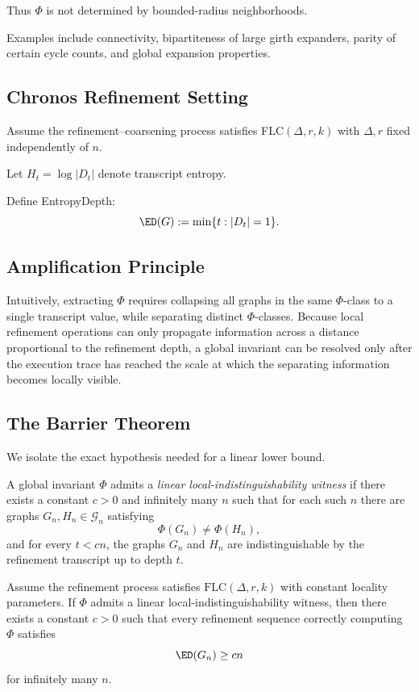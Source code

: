 Thus $\Phi$ is not determined by bounded-radius neighborhoods.

Examples include connectivity, bipartiteness of large girth expanders,
parity of certain cycle counts, and global expansion properties.

\subsection{Chronos Refinement Setting}

Assume the refinement–coarsening process satisfies
FLC$(\Delta,r,k)$ with $\Delta,r$ fixed independently of $n$.

Let $H_t = \log |D_t|$ denote transcript entropy.

Define EntropyDepth:
\[
\ED(G) := \min \{ t : |D_t| = 1 \}.
\]

\subsection{Amplification Principle}

Intuitively, extracting $\Phi$ requires collapsing
all graphs in the same $\Phi$-class to a single transcript value,
while separating distinct $\Phi$-classes. Because local refinement operations
can only propagate information across a distance proportional to the refinement
depth, a global invariant can be resolved only after the execution trace has
reached the scale at which the separating information becomes locally visible.

\subsection{The Barrier Theorem}

We isolate the exact hypothesis needed for a linear lower bound.

\begin{definition}
A global invariant $\Phi$ admits a \emph{linear local-indistinguishability
witness} if there exists a constant $c>0$ and infinitely many $n$ such that
for each such $n$ there are graphs $G_n,H_n\in\mathcal{G}_n$ satisfying
\[
\Phi(G_n)\neq \Phi(H_n),
\]
and for every $t<c n$, the graphs $G_n$ and $H_n$ are indistinguishable by
the refinement transcript up to depth $t$.
\end{definition}

\begin{theorem}
Assume the refinement process satisfies $\mathrm{FLC}(\Delta,r,k)$ with
constant locality parameters. If $\Phi$ admits a linear
local-indistinguishability witness, then there exists a constant $c>0$ such
that every refinement sequence correctly computing $\Phi$ satisfies
\[
\ED(G_n)\ge c n
\]
for infinitely many $n$.
\end{theorem}

